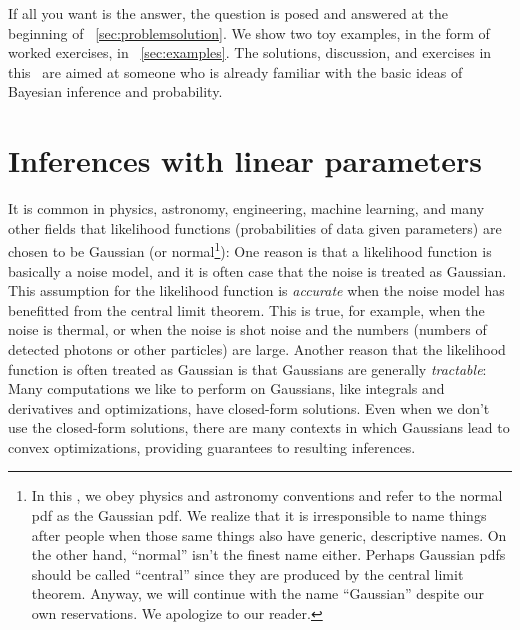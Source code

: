 If all you want is the answer, the question is posed and answered at the
beginning of \sectionname~\ref{sec:problemsolution}.
We show two toy examples, in the form of worked exercises, in
\sectionname~\ref{sec:examples}.
The solutions, discussion, and exercises in this \documentname\ are aimed at
someone who is already familiar with the basic ideas of
Bayesian inference and probability.


\section{Inferences with linear parameters}

It is common in physics, astronomy, engineering, machine learning, and many other fields that likelihood functions
(probabilities of data given parameters) are chosen to be Gaussian
(or normal\footnote{In this \documentname, we obey physics and astronomy
conventions and refer to the normal pdf as the Gaussian pdf. We realize that it
is irresponsible to name things after people when those same things also have generic,
descriptive names. On the other hand, ``normal'' isn't the finest name either.
Perhaps Gaussian pdfs should be called ``central'' since they are produced by
the central limit theorem. Anyway, we will continue with the name ``Gaussian''
despite our own reservations. We apologize to our reader.}):
One reason is that a likelihood function is basically a noise model,
and it is often case that the noise is treated as Gaussian.
This assumption for the likelihood function is \emph{accurate} when the noise
model has benefitted from the central limit theorem.
This is true, for example, when the noise is thermal, or when the
noise is shot noise and the numbers (numbers of detected photons or other
particles) are large.
Another reason that the likelihood function is often treated as
Gaussian is that Gaussians are generally \emph{tractable}:
Many computations we like to perform on Gaussians, like integrals and
derivatives and optimizations, have closed-form solutions.
Even when we don't use the closed-form solutions, there are many
contexts in which Gaussians lead to convex optimizations,
providing guarantees to resulting inferences.

